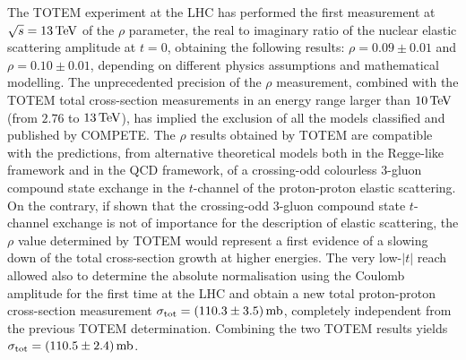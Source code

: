 The TOTEM experiment at the LHC has performed the first measurement at $\sqrt s = 13\,{\rm TeV}$ of the $\rho$ parameter, the real to imaginary ratio of the nuclear elastic scattering amplitude at $t=0$, obtaining the following results: $\rho = 0.09 \pm 0.01$ and $\rho = 0.10 \pm 0.01$, depending on different physics assumptions and mathematical modelling. The unprecedented precision of the $\rho$ measurement, combined with the TOTEM total cross-section measurements in an energy range larger than $10\,{\rm TeV}$ (from $2.76$ to $13\,{\rm TeV}$), has implied the exclusion of all the models classified and published by COMPETE. The $\rho$ results obtained by TOTEM are compatible with the predictions, from alternative theoretical models both in the Regge-like framework and in the QCD framework, of a crossing-odd colourless 3-gluon compound state exchange in the $t$-channel of the proton-proton elastic scattering. On the contrary, if shown that the crossing-odd 3-gluon compound state $t$-channel exchange is not of importance for the description of elastic scattering, the $\rho$ value determined by TOTEM would represent a first evidence of a slowing down of the total cross-section growth at higher energies.
%
The very low-$|t|$ reach allowed also to determine the absolute normalisation using the Coulomb amplitude for the first time at the LHC and obtain a new total proton-proton cross-section measurement $\sigma_{\rm tot} = (110.3 \pm 3.5)\,{\rm mb}$, completely independent from the previous TOTEM determination. Combining the two TOTEM results yields $\sigma_{\rm tot} = (110.5 \pm 2.4)\,{\rm mb}$.
